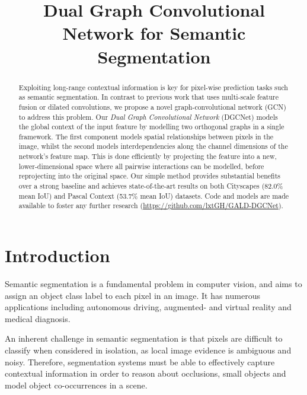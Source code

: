 \documentclass{bmvc2k}
\title{Dual Graph Convolutional Network for Semantic Segmentation}
\begin{document}
\maketitle

\begin{abstract}
\noindent
Exploiting long-range contextual information is key for pixel-wise prediction tasks such as semantic segmentation.
In contrast to previous work that uses multi-scale feature fusion or dilated convolutions, we propose a novel graph-convolutional network (GCN) to address this problem.
Our \emph{Dual Graph Convolutional Network} (DGCNet) models the global context of the input feature by modelling two orthogonal graphs in a single framework.
The first component models spatial relationships between pixels in the image, whilst the second models interdependencies along the channel dimensions of the network's feature map.
This is done efficiently by projecting the feature into a new, lower-dimensional space where all pairwise interactions can be modelled, before reprojecting into the original space.
Our simple method provides substantial benefits over a strong baseline and achieves state-of-the-art results on both Cityscapes (82.0\% mean IoU) and Pascal Context (53.7\% mean IoU) datasets.
Code and models are made available to foster any further research (\url{https://github.com/lxtGH/GALD-DGCNet}).
\end{abstract} 
\section{Introduction}


Semantic segmentation is a fundamental problem in computer vision, and aims to assign an object class label to each pixel in an image.
It has numerous applications including autonomous driving, augmented- and virtual reality and medical diagnosis.

An inherent challenge in semantic segmentation is that 
pixels are difficult to classify when considered in isolation, 
as local image evidence is ambiguous and noisy.
Therefore, segmentation systems must be able to effectively capture contextual information in order to reason about occlusions, small objects and model object co-occurrences in a scene.
\end{document}
